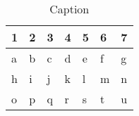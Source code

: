 \begin{table}[]
\centering
\caption{Caption}
\begin{tabular}{lllllll}
\hline
1			& 2			& 3 			& 4			& 5			& 6 			& 7			\\ \hline
a			& b			& c 			& d 		& e			& f  			& g 		\\
h			& i			& j 			& k 		& l			& m  			& n 		\\
o			& p			& q 			& r 		& s			& t  			& u 		\\
\hline
\end{tabular}
\label{table:todo}
\end{table}


